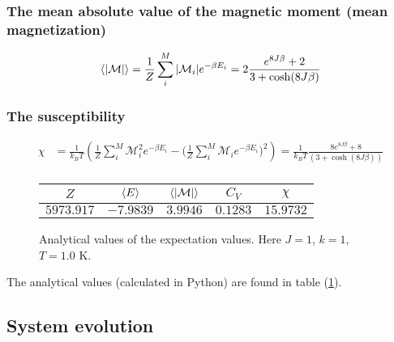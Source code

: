\documentclass[11pt]{article}
\begin{document}
\begin{flushleft}
\subsubsection*{The mean absolute value of the magnetic moment (mean magnetization)}

\begin{align*}
\braket{|\mathcal{M}|} 
&= \frac{1}{Z} \sum_i^M |\mathcal{M}_i| e^{- \beta E_i} =2 \frac{e^{8J \beta} + 2 }{3 + \cosh (8 J \beta)} \\
\end{align*}

\subsubsection*{The susceptibility}

\begin{align*}
\chi &= \frac{1}{k_B T} (\frac{1}{Z} \sum_i^M \mathcal{M}_i^2 e^{- \beta E_i}- \Big(\frac{1}{Z} \sum_i^M \mathcal{M}_i e^{- \beta E_i}\Big)^2)
= \frac{1}{k_B T} 
\frac{8e^{8J \beta} +8}{(3 + \cosh (8 J \beta))} \\
\end{align*}

\end{flushleft}

\begin{flushleft}

\begin{figure}[H]
\centering
\begin{tabular}{|c|c|c|c|c|}
\hline
$Z$ &$\braket{E}$ & $\braket{|\mathcal{M}|}$ & $C_V$ & $\chi$\\
\hline
$5973.917$ & $-7.9839$ & $3.9946$ & $0.1283$ & $15.9732$\\
\hline
\end{tabular}
\caption{Analytical values of the expectation values. Here $J=1$, $k=1$, $T=1.0$ K.}
\label{Fig::analytical}
\end{figure}

The analytical values (calculated in Python) are found in table (\ref{Fig::analytical}). 
\end{flushleft}

\subsection{System evolution}
\end{document}
